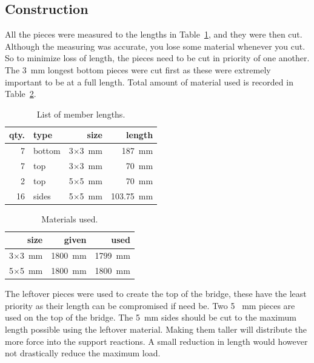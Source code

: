\documentclass[12pt]{article}
\begin{document}
\subsection{Construction}
All the pieces were measured to the lengths in Table~\ref{list}, and they were then cut. Although the measuring was accurate, you lose some material whenever you cut. So to minimize loss of length, the pieces need to be cut in priority of one another. The 3~mm longest bottom pieces were cut first as these were extremely important to be at a full length. Total amount of material used is recorded in Table~\ref{materials}.
		\begin{table}[h!]
			\caption{List of member lengths.}
			\begin{center}
			\begin{tabular}{ | r | l | r | r | }
				\hline
				qty. & type & size & length \\ \hline
				7 & bottom & 3$\times$3~mm & 187~mm \\ \hline
				7 & top & 3$\times$3~mm & 70~mm \\ \hline
				2 & top & 5$\times$5~mm & 70~mm \\ \hline
				16 & sides & 5$\times$5~mm & 103.75~mm \\ \hline
			\end{tabular}
			\end{center}
			\label{list}
		\end{table}
		\begin{table}[h!]
			\caption{Materials used.}
			\begin{center}
			\begin{tabular}{ | r | r | r | }
				\hline
				size & given & used \\ \hline
				3$\times$3~mm & 1800~mm & 1799~mm \\ \hline
				5$\times$5~mm & 1800~mm & 1800~mm \\ \hline
			\end{tabular}
			\end{center}
			\label{materials}
		\end{table}

The leftover pieces were used to create the top of the bridge, these have the least priority as their length can be compromised if need be. Two 5 ~mm pieces are used on the top of the bridge. The 5~mm sides should be cut to the maximum length possible using the leftover material. Making them taller will distribute the more force into the support reactions. A small reduction in length would however not drastically reduce the maximum load. 
\end{document}
